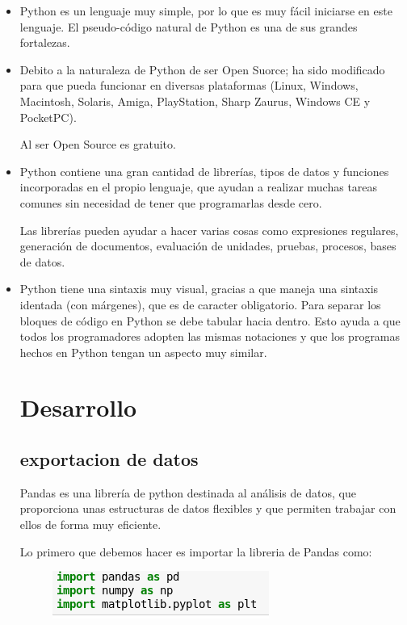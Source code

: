 \documentclass{article}
\begin{document}
\begin{itemize}
\item
Python es un lenguaje muy simple, por lo que es muy fácil iniciarse en este lenguaje. El pseudo-código natural de Python es una de sus grandes fortalezas.

\item
Debito a la naturaleza de Python de ser Open Suorce; ha sido modificado para que pueda funcionar en diversas plataformas (Linux, Windows, Macintosh, Solaris, Amiga, PlayStation, Sharp Zaurus, Windows CE y PocketPC).

Al ser Open Source es gratuito.

\item
Python contiene una gran cantidad de librerías, tipos de datos y funciones incorporadas en el propio lenguaje, que ayudan a realizar muchas tareas comunes sin necesidad de tener que programarlas desde cero.

Las librerías pueden ayudar a hacer varias cosas como expresiones regulares, generación de documentos, evaluación de unidades, pruebas, procesos, bases de datos.

\item
Python tiene una sintaxis muy visual, gracias a que maneja una sintaxis identada (con márgenes), que es de caracter obligatorio. Para separar los bloques de código en Python se debe tabular hacia dentro. Esto ayuda a que todos los programadores adopten las mismas notaciones y que los programas hechos en Python tengan un aspecto muy similar.






\section{Desarrollo}
\subsection{exportacion de datos}
Pandas es una librería de python destinada al análisis de datos, que proporciona unas estructuras de datos flexibles y que permiten trabajar con ellos de forma muy eficiente.


Lo primero que debemos hacer es importar la libreria de Pandas como:

\begin{figure}[h!]
  \includegraphics[width=\linewidth]{1.png}
 \end{figure}



\end{itemize}
\end{document}
